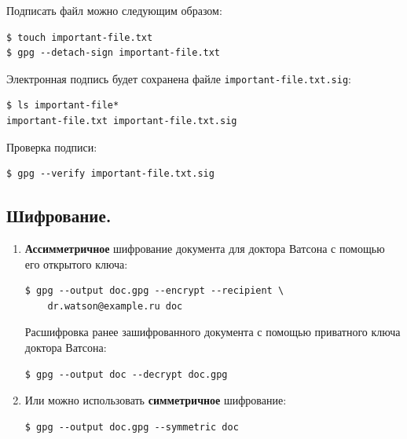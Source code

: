 \documentclass[presentation]{beamer}
\newcommand{\EndOfSectionOrnament}{
  \begin{center}
    \pgfornament[width=0.5\textwidth]{88}
    \end{center}
}
\begin{document}
\begin{frame}[fragile]{}
  Подписать файл можно следующим образом:
\begin{verbatim}
$ touch important-file.txt
$ gpg --detach-sign important-file.txt
\end{verbatim}

  Электронная подпись будет сохранена файле
  \texttt{important-file.txt.sig}:
\begin{verbatim}
$ ls important-file*
important-file.txt important-file.txt.sig
\end{verbatim}

  Проверка подписи:
\begin{verbatim}
$ gpg --verify important-file.txt.sig
\end{verbatim}

  \EndOfSectionOrnament
\end{frame}



\subsection{Шифрование.}

\begin{frame}[fragile]{}
  \begin{enumerate}
    
  \item \textbf{Ассимметричное} шифрование документа для доктора
    Ватсона с помощью его открытого ключа:
\begin{verbatim}
$ gpg --output doc.gpg --encrypt --recipient \
    dr.watson@example.ru doc
\end{verbatim}

  Расшифровка ранее зашифрованного документа с помощью приватного
  ключа доктора Ватсона:
\begin{verbatim}
$ gpg --output doc --decrypt doc.gpg
\end{verbatim}

\item Или можно использовать \textbf{симметричное} шифрование:
\begin{verbatim}
$ gpg --output doc.gpg --symmetric doc
\end{verbatim}
  \end{enumerate}

  \EndOfSectionOrnament
\end{frame}


\end{document}
